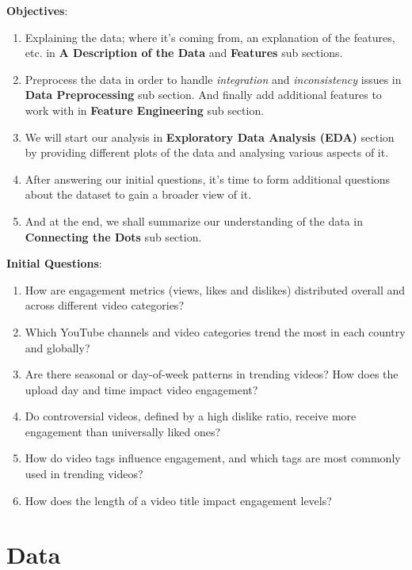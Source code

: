 \documentclass[a4paper,12pt]{article}
\begin{document}
\noindent \textbf{Objectives}: 
\begin{enumerate}
    \item Explaining the data; where it's coming from, an explanation of the features, etc. in \textbf{A Description of the Data} and \textbf{Features} sub sections.
    \item Preprocess the data in order to handle \textit{integration} and \textit{inconsistency} issues in \textbf{Data Preprocessing} sub section. And finally add additional features
    to work with in \textbf{Feature Engineering} sub section.
    \item We will start our analysis in \textbf{Exploratory Data Analysis (EDA)} section by providing different plots of the data and analysing various aspects of it.
    \item After answering our initial questions, it's time to form additional questions about the dataset to gain a broader view of it.
    \item And at the end, we shall summarize our understanding of the data in \textbf{Connecting the Dots} sub section.
\end{enumerate}

\noindent \textbf{Initial Questions}: 
\begin{enumerate}
    \item How are engagement metrics (views, likes and dislikes) distributed overall and across different video categories?
    \item Which YouTube channels and video categories trend the most in each country and globally?
    \item Are there seasonal or day-of-week patterns in trending videos? How does the upload day and time impact video engagement?
    \item Do controversial videos, defined by a high dislike ratio, receive more engagement than universally liked ones?
    \item How do video tags influence engagement, and which tags are most commonly used in trending videos?
    \item How does the length of a video title impact engagement levels?
\end{enumerate} 


\section*{Data}
\end{document}
